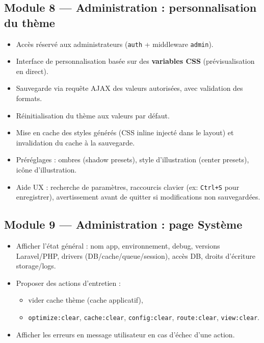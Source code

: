 \documentclass[12pt,a4paper]{article}
\begin{document}
\subsection{Module 8 --- Administration : personnalisation du thème}
\begin{itemize}[leftmargin=*]
  \item Accès réservé aux administrateurs (\texttt{auth} + middleware \texttt{admin}).
  \item Interface de personnalisation basée sur des \textbf{variables CSS} (prévisualisation en direct).
  \item Sauvegarde via requête AJAX des valeurs autorisées, avec validation des formats.
  \item Réinitialisation du thème aux valeurs par défaut.
  \item Mise en cache des styles générés (CSS inline injecté dans le layout) et invalidation du cache à la sauvegarde.
  \item Préréglages : ombres (shadow presets), style d'illustration (center presets), icône d'illustration.
  \item Aide UX : recherche de paramètres, raccourcis clavier (ex: \texttt{Ctrl+S} pour enregistrer), avertissement avant de quitter si modifications non sauvegardées.
\end{itemize}

\subsection{Module 9 --- Administration : page Système}
\begin{itemize}[leftmargin=*]
  \item Afficher l'état général : nom app, environnement, debug, versions Laravel/PHP, drivers (DB/cache/queue/session), accès DB, droits d'écriture storage/logs.
  \item Proposer des actions d'entretien :
    \begin{itemize}[leftmargin=*]
      \item vider cache thème (cache applicatif),
      \item \texttt{optimize:clear}, \texttt{cache:clear}, \texttt{config:clear}, \texttt{route:clear}, \texttt{view:clear}.
    \end{itemize}
  \item Afficher les erreurs en message utilisateur en cas d'échec d'une action.
\end{itemize}
\end{document}
